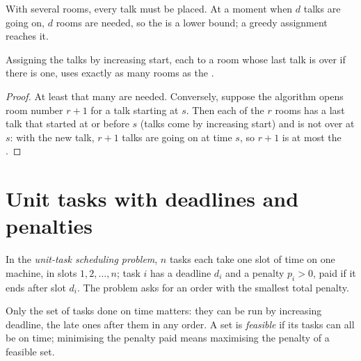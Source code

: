 With several rooms, every talk must be placed. At a moment when $d$ talks are going on, $d$ rooms are needed, so the
 is a lower bound; a greedy assignment reaches it.

\label{lst:b1:greedy-proofs:rooms}

\label{out:b1:greedy-proofs:rooms}

\begin{proposition}\label{prop:b1:greedy-proofs:rooms}
Assigning the talks by increasing start, each to a room whose last talk is over if there is one, uses exactly as many
rooms as the .
\end{proposition}

\begin{proof}
At least that many are needed. Conversely, suppose the algorithm opens room number $r + 1$ for a talk starting at $s$.
Then each of the $r$ rooms has a last talk that started at or before $s$ (talks come by increasing start) and is not
over at $s$: with the new talk, $r + 1$ talks are going on at time $s$, so $r + 1$ is at most the .
\end{proof}

\section{Unit tasks with deadlines and penalties}\label{sec:b1:greedy-proofs:penalties}

\begin{definition}\label{def:b1:greedy-proofs:unit-tasks}
In the \emph{unit-task scheduling problem}, $n$ tasks each take one slot of time on
one machine, in slots $1, 2, \dots, n$; task $i$ has a deadline $d_i$ and a penalty $p_i > 0$, paid if it ends after slot
$d_i$. The problem asks for an order with the smallest total penalty.
\end{definition}

Only the set of tasks done on time matters: they can be run by increasing deadline, the late ones after them in any
order. A set is \emph{feasible} if its tasks can all be on time; minimising the penalty paid means maximising the
penalty of a feasible set.

